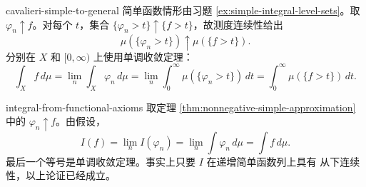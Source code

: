 \begin{solution}{cavalieri-simple-to-general}
简单函数情形由习题 \ref{ex:simple-integral-level-sets}。取
\(\varphi_n\uparrow f\)。对每个 \(t\)，集合
\(\{\varphi_n>t\}\uparrow\{f>t\}\)，故测度连续性给出
\[
 \mu(\{\varphi_n>t\})\uparrow\mu(\{f>t\}).
\]
分别在 \(X\) 和 \([0,\infty)\) 上使用单调收敛定理：
\[
 \int_Xf\,d\mu
 =\lim_n\int_X\varphi_n\,d\mu
 =\lim_n\int_0^\infty\mu(\{\varphi_n>t\})\,dt
 =\int_0^\infty\mu(\{f>t\})\,dt.
\]
\end{solution}

\begin{solution}{integral-from-functional-axioms}
取定理 \ref{thm:nonnegative-simple-approximation} 中的
\(\varphi_n\uparrow f\)。由假设，
\[
 I(f)=\lim_nI(\varphi_n)=\lim_n\int\varphi_n\,d\mu=\int f\,d\mu.
\]
最后一个等号是单调收敛定理。事实上只要 \(I\) 在递增简单函数列上具有
从下连续性，以上论证已经成立。
\end{solution}
